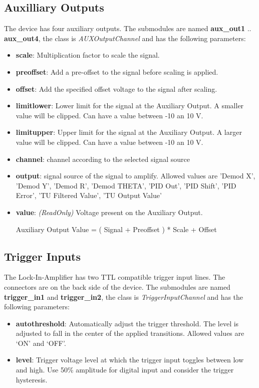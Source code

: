 \documentclass[11pt]{article} %
\begin{document}
\subsection{Auxilliary Outputs}
The device has four auxiliary outputs. The submodules are named {\bf aux\_out1} .. {\bf aux\_out4}, the class is {\it AUXOutputChannel} and has the following parameters:
\begin{itemize}
\item {\bf scale}: Multiplication factor to scale the signal.
\item {\bf preoffset}: Add a pre-offset to the signal before scaling is applied.
\item {\bf offset}: Add the specified offset voltage to the signal after scaling.
\item {\bf limitlower}: Lower limit for the signal at the Auxiliary Output. A smaller value will be clipped. Can have a value between -10 an 10 V.
\item {\bf limitupper}: Upper limit for the signal at the Auxiliary Output. A larger value will be clipped. Can have a value between -10 an 10 V.
\item {\bf channel}: channel according to the selected signal source
\item {\bf output}: signal source of the signal to amplify. Allowed values are 'Demod X', 'Demod Y', 'Demod R', 'Demod THETA', 'PID Out', 'PID Shift', 'PID Error', 'TU Filtered Value', 'TU Output Value'
\item {\bf value}: {\it (ReadOnly)} Voltage present on the Auxiliary Output. \\
\centerline{Auxiliary Output Value = ( Signal + Preoffset ) * Scale + Offset}
\end{itemize}


\subsection{Trigger Inputs}
The Lock-In-Amplifier has two TTL compatible trigger input lines. The connectors are on the back side of the device. The submodules are named {\bf trigger\_in1} and {\bf trigger\_in2}, the class is {\it TriggerInputChannel} and has the following parameters:
\begin{itemize}
\item {\bf autothreshold}: Automatically adjust the trigger threshold. The level is adjusted to fall in the center of the applied transitions. Allowed values are `ON' and `OFF'.
\item {\bf level}: Trigger voltage level at which the trigger input toggles between low and high. Use 50\% amplitude for digital input and consider the trigger hysteresis.
\end{itemize}
\end{document}
